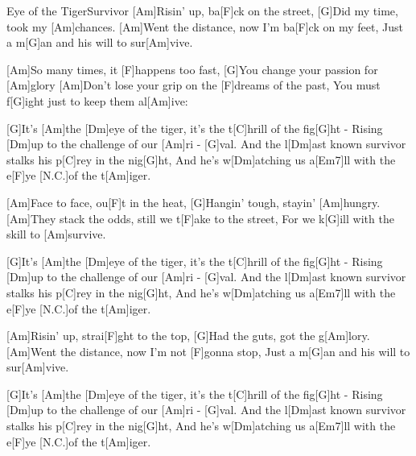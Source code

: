 \documentclass[../main.tex]{subfiles}
\begin{document}
\begin{song}{Eye of the Tiger}{Survivor}{}
[Am]Risin' up, ba[F]ck on the street,
[G]Did my time, took my [Am]chances.
[Am]Went the distance, now I'm ba[F]ck on my feet,
Just a m[G]an and his will to sur[Am]vive.

[Am]So many times, it [F]happens too fast,
[G]You change your passion for [Am]glory
[Am]Don't lose your grip on the [F]dreams of the past,
You must f[G]ight just to keep them al[Am]ive:

[G]It's [Am]the [Dm]eye of the tiger, it's the t[C]hrill of the fig[G]ht -
Rising [Dm]up to the challenge of our [Am]ri - [G]val.
And the l[Dm]ast known survivor stalks his p[C]rey in the nig[G]ht,
And he's w[Dm]atching us a[Em7]ll with the e[F]ye [N.C.]of the t[Am]iger.

[Am]Face to face, ou[F]t in the heat,
[G]Hangin' tough, stayin' [Am]hungry.
[Am]They stack the odds, still we t[F]ake to the street,
For we k[G]ill with the skill to [Am]survive.

[G]It's [Am]the [Dm]eye of the tiger, it's the t[C]hrill of the fig[G]ht -
Rising [Dm]up to the challenge of our [Am]ri - [G]val.
And the l[Dm]ast known survivor stalks his p[C]rey in the nig[G]ht,
And he's w[Dm]atching us a[Em7]ll with the e[F]ye [N.C.]of the t[Am]iger.

[Am]Risin' up, strai[F]ght to the top,
[G]Had the guts, got the g[Am]lory.
[Am]Went the distance, now I'm not [F]gonna stop,
Just a m[G]an and his will to sur[Am]vive.

[G]It's [Am]the [Dm]eye of the tiger, it's the t[C]hrill of the fig[G]ht -
Rising [Dm]up to the challenge of our [Am]ri - [G]val.
And the l[Dm]ast known survivor stalks his p[C]rey in the nig[G]ht,
And he's w[Dm]atching us a[Em7]ll with the e[F]ye [N.C.]of the t[Am]iger.
\end{song}
\end{document}

